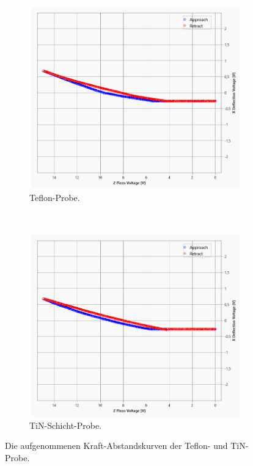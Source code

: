 \begin{figure}[H]
\centering
	\begin{subfigure}[t]{0.45\textwidth}
	\includegraphics[width=\textwidth]{AFM_auswertung/teflon_kurve.png}
	\caption{Teflon-Probe.}
	\end{subfigure}
	~
	\begin{subfigure}[t]{0.45\textwidth}
	\includegraphics[width=\textwidth]{AFM_auswertung/TiN_kurve.png}
	\caption{TiN-Schicht-Probe.}
	\end{subfigure}
\caption{Die aufgenommenen Kraft-Abstandskurven der Teflon- und TiN-Probe.}
\label{abb:teflonTiN}
\end{figure}
